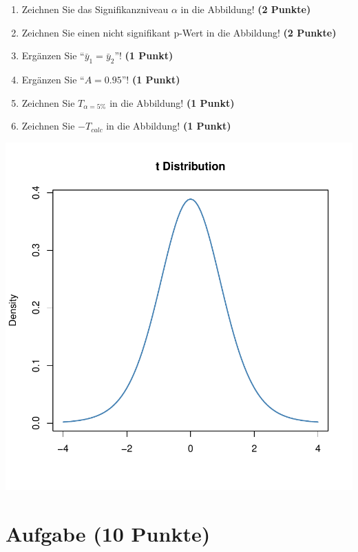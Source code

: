 \documentclass[a4paper, 10pt]{scrartcl}\usepackage[]{graphicx}\usepackage[]{xcolor}
\makeatletter
\def\maxwidth{ %
  \ifdim\Gin@nat@width>\linewidth
    \linewidth
  \else
    \Gin@nat@width
  \fi
}
\makeatother
\begin{document}
\begin{enumerate}
\item Zeichnen Sie das Signifikanzniveau $\alpha$ in die Abbildung! \textbf{(2 Punkte)} 
\item Zeichnen Sie einen nicht signifikant p-Wert in die Abbildung! \textbf{(2 Punkte)} 
\item Erg{\"a}nzen Sie "`$\bar{y}_1 = \bar{y}_2$"'! \textbf{(1 Punkt)} 
\item Erg{\"a}nzen Sie "`$A = 0.95$"'! \textbf{(1 Punkt)}
\item Zeichnen Sie $T_{\alpha=5\%}$ in die Abbildung! \textbf{(1 Punkt)} 
\item Zeichnen Sie $-T_{calc}$ in die Abbildung! \textbf{(1 Punkt)} 
\end{enumerate}



{\centering \includegraphics[width=\maxwidth]{img/statistisches-testen-3-1} 

}


 
\clearpage

\section{Aufgabe \hfill (10 Punkte)}
\end{document}
